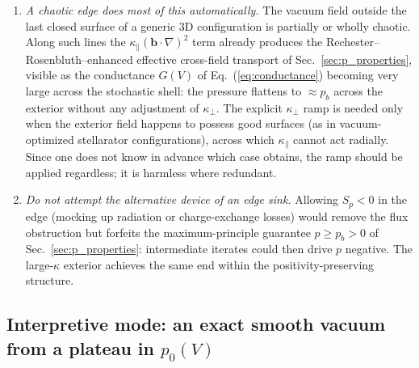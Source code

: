 \documentclass[english]{article}
\newcommand{\bb}{\mathbf{b}}
\begin{document}
\begin{enumerate}
\item \emph{A chaotic edge does most of this automatically.} The vacuum field outside the last
closed surface of a generic 3D configuration is partially or wholly chaotic. Along such lines the
$\kappa_\parallel(\bb\cdot\nabla)^{2}$ term already produces the Rechester--Rosenbluth--enhanced
effective cross-field transport of Sec.~\ref{sec:p_properties}, visible as the conductance $G(V)$
of Eq.~(\ref{eq:conductance}) becoming very large across the stochastic shell: the pressure
flattens to $\approx p_b$ across the exterior without any adjustment of $\kappa_\perp$. The
explicit $\kappa_\perp$ ramp is needed only when the exterior field happens to possess good
surfaces (as in vacuum-optimized stellarator configurations), across which $\kappa_\parallel$
cannot act radially. Since one does not know in advance which case obtains, the ramp should be
applied regardless; it is harmless where redundant.
\item \emph{Do not attempt the alternative device of an edge sink.} Allowing $S_p<0$ in the edge
(mocking up radiation or charge-exchange losses) would remove the flux obstruction but forfeits
the maximum-principle guarantee $p\ge p_b>0$ of Sec.~\ref{sec:p_properties}: intermediate iterates
could then drive $p$ negative. The large-$\kappa$ exterior achieves the same end within the
positivity-preserving structure.
\end{enumerate}

\subsection{Interpretive mode: an exact smooth vacuum from a plateau in $p_0(V)$}
\label{sec:edge_interpretive}
\end{document}
